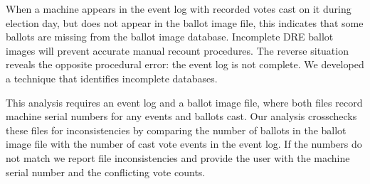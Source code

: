 When a machine
appears in the event log with recorded votes cast on it during
election day, but does not appear in the ballot image file, this
indicates that some ballots are missing from the ballot image
database. Incomplete DRE ballot images will prevent accurate manual
recount procedures. The reverse situation reveals the opposite
procedural error: the event log is not complete.  We developed a
technique that identifies incomplete databases.   

This analysis requires an event log and a ballot image file, where
both files record machine serial numbers for any events and ballots
cast.  Our analysis crosschecks these files for inconsistencies by comparing the
number of ballots in the ballot image file with the number of cast vote events
in the event log. If the numbers do not match we report file 
inconsistencies and provide the user with the machine serial number
and the conflicting vote counts.      
